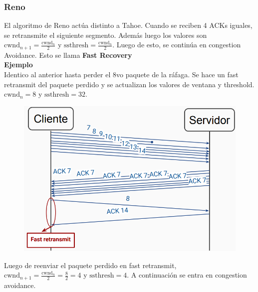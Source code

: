 \documentclass[titlepage,a4paper]{article}
\begin{document}
\subsubsection{Reno}

El algoritmo de Reno actúa distinto a Tahoe. Cuando se reciben 4 ACKs iguales, se retransmite el siguiente segmento. Además luego los valores son $ \mathrm{cwnd}_{n+1} = \frac{\mathrm{cwnd}_{n}}{2} $ y $ \mathrm{ssthresh} = \frac{\mathrm{cwnd}_{n}}{2} $. Luego de esto, se continúa en congestion Avoidance. Esto se llama \textbf{Fast Recovery} \\

\textbf{Ejemplo} \\

Identico al anterior hasta perder el 8vo paquete de la ráfaga. Se hace un fast retransmit del paquete perdido y se actualizan los valores de ventana y threshold. $\mathrm{cwnd}_n = 8 $ y $\mathrm{ssthresh} = 32$.

\begin{figure}[H]
\centering
\includegraphics[width=\textwidth]{imagenes/fastRetransmit.png}
\end{figure}

Luego de reenviar el paquete perdido en fast retransmit,  $\mathrm{cwnd}_{n+1} = \frac{\mathrm{cwnd}_{n}}{2} = \frac{8}{2} = 4 $ y $\mathrm{ssthresh} = 4 $. A continuación se entra en congestion avoidance.
\end{document}
